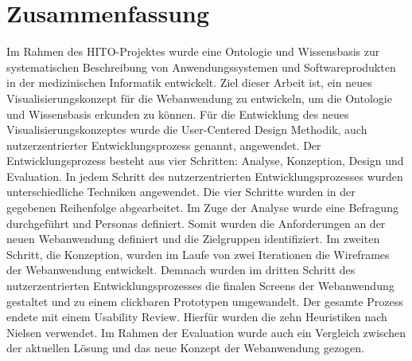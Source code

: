 \chapter{Zusammenfassung}

Im Rahmen des HITO-Projektes wurde eine Ontologie und Wissensbasis zur systematischen Beschreibung von Anwendungssystemen und Softwareprodukten in der medizinischen Informatik entwickelt.
Ziel dieser Arbeit ist, ein neues Visualisierungskonzept für die Webanwendung zu entwickeln, um die Ontologie und Wissensbasis erkunden zu können.
Für die Entwicklung des neues Visualisierungskonzeptes wurde die User-Centered Design Methodik, auch nutzerzentrierter Entwicklungsprozess genannt, angewendet.
Der Entwicklungsprozess besteht aus vier Schritten: Analyse, Konzeption, Design und Evaluation.
In jedem Schritt des nutzerzentrierten Entwicklungsprozesses wurden unterschiedliche Techniken angewendet.
Die vier Schritte wurden in der gegebenen Reihenfolge abgearbeitet.
Im Zuge der Analyse wurde eine Befragung durchgeführt und Personas definiert.
Somit wurden die Anforderungen an der neuen Webanwendung definiert und die Zielgruppen identifiziert.
Im zweiten Schritt, die Konzeption, wurden im Laufe von zwei Iterationen die Wireframes der Webanwendung entwickelt.
Demnach wurden im dritten Schritt des nutzerzentrierten Entwicklungsprozesses die finalen Screens der Webanwendung gestaltet und zu einem clickbaren Prototypen umgewandelt.
Der gesamte Prozess endete mit einem Usability Review.
Hierfür wurden die zehn Heuristiken nach Nielsen verwendet.
Im Rahmen der Evaluation wurde auch ein Vergleich zwischen der aktuellen Lösung und das neue Konzept der Webanwendung gezogen.

\vfill
